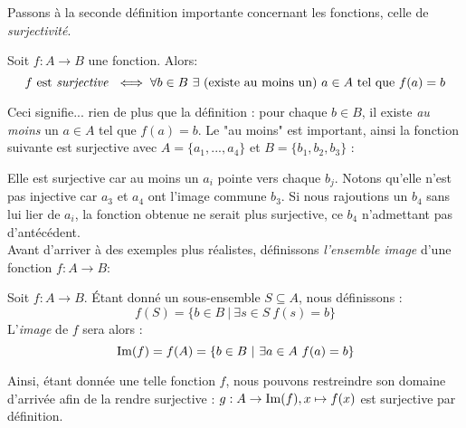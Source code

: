 \noindent Passons à la seconde définition importante concernant les fonctions, celle de \textit{surjectivité}.\\

\begin{boxdef}
Soit $f: A \to B$ une fonction. Alors: \\
$$f \text{ est \textit{surjective} } \iff \forall b \in B \ \exists \text{ (existe au moins un) }a \in A \text{ tel que } f(a) = b
$$
\end{boxdef}
Ceci signifie... rien de plus que la définition : pour chaque $b \in B$, il existe \textit{au moins} un $a \in A$ tel que $f(a) = b$. Le "au moins" est important, ainsi la fonction suivante est surjective avec $A = \{a_1, ..., a_4\}$ et $B = \{b_1, b_2, b_3\}$ :

\begin{center}
\end{center}
Elle est surjective car au moins un $a_i$ pointe vers chaque $b_j$. Notons qu'elle n'est pas injective car $a_3$ et $a_4$ ont l'image commune $b_3$. Si nous rajoutions un $b_4$ sans lui lier de $a_i$, la fonction obtenue ne serait plus surjective, ce $b_4$ n'admettant pas d'antécédent.\\

\noindent Avant d'arriver à des exemples plus réalistes, définissons \textit{l'ensemble image} d'une fonction $f: A \to B$:
\begin{boxdef}
Soit $f: A \to B$. Étant donné un sous-ensemble $S \subseteq A$, nous définissons : 
$$f(S) = \{b \in B \ | \ \exists s  \in S  \ f(s) = b\}
$$
L'\textit{image} de $f$ sera alors :
$$\Ima(f) = f(A) = \{ b \in B \ | \ \exists a \in A \ f(a) = b \}
$$
\end{boxdef}
Ainsi, étant donnée une telle fonction $f$, nous pouvons restreindre son domaine d'arrivée afin de la rendre surjective : $g: A \to \operatorname{Im}(f), x \mapsto f(x)$ est surjective par définition.\\

